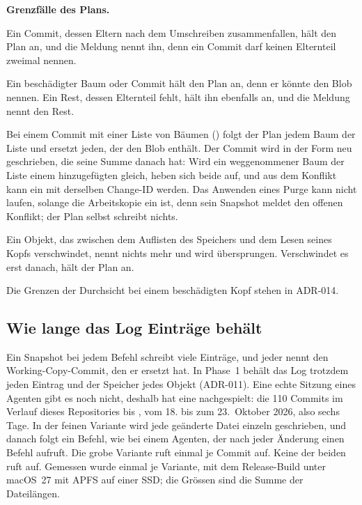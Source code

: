 {\startinfobox
{\bf Grenzfälle des Plans.}
\startitemize
\item Ein Commit, dessen Eltern nach dem Umschreiben zusammenfallen, hält den Plan an,
und die Meldung nennt ihn, denn ein Commit darf keinen Elternteil zweimal nennen.
\item Ein beschädigter Baum oder Commit hält den Plan an, denn er könnte den Blob nennen.
Ein Rest, dessen Elternteil fehlt, hält ihn ebenfalls an, und die Meldung nennt den Rest.
\item Bei einem Commit mit einer Liste von Bäumen () folgt der Plan jedem Baum
der Liste und ersetzt jeden, der den Blob enthält.
Der Commit wird in der Form neu geschrieben, die seine Summe danach hat:
Wird ein weggenommener Baum der Liste einem hinzugefügten gleich, heben sich beide auf,
und aus dem Konflikt kann ein  mit derselben Change-ID werden.
Das Anwenden eines Purge kann nicht laufen, solange die Arbeitskopie ein  ist,
denn sein Snapshot meldet den offenen Konflikt; der Plan selbst schreibt nichts.
\item Ein Objekt, das zwischen dem Auflisten des Speichers und dem Lesen seines Kopfs verschwindet,
nennt nichts mehr und wird übersprungen.
Verschwindet es erst danach, hält der Plan an.
\item Die Grenzen der Durchsicht bei einem beschädigten Kopf stehen in ADR-014.
\stopitemize
\stopinfobox

\subsection{Wie lange das Log Einträge behält}

Ein Snapshot bei jedem Befehl schreibt viele Einträge, und jeder nennt den Working-Copy-Commit,
den er ersetzt hat. In Phase~1 behält das Log trotzdem jeden Eintrag und der Speicher jedes
Objekt (ADR-011). Eine echte Sitzung eines Agenten gibt es noch nicht, deshalb hat
 eine nachgespielt: die 110 Commits im Verlauf dieses
Repositories bis , vom 18. bis zum 23.~Oktober 2026, also sechs Tage. In der
feinen Variante wird jede geänderte Datei einzeln geschrieben, und danach folgt ein Befehl, wie
bei einem Agenten, der nach jeder Änderung einen Befehl aufruft. Die grobe Variante ruft
 einmal je Commit auf. Keine der beiden ruft  auf. Gemessen wurde
einmal je Variante, mit dem Release-Build unter macOS~27 mit APFS auf einer SSD; die Grössen
sind die Summe der Dateilängen.

}

